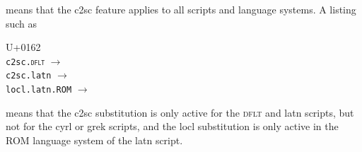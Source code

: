 \smallskip
\noindent means that the c2sc feature applies to all scripts and
language systems.  A listing such as

\smallskip

\begin{substitutions*}
\UCSchartfont
U+0162 \\
\quad \texttt{c2sc.\textsc{dflt}} $\to$ \\
\quad \texttt{c2sc.latn} $\to$ \\
\quad \texttt{locl.latn.ROM} $\to$ 
\end{substitutions*}

\smallskip

\noindent means that the c2sc substitution is only active for
the \textsc{dflt} and latn scripts, but not for the cyrl or grek
scripts, and the locl substitution is only active in the ROM language
system of the latn script.

\endgroup

\endinput
